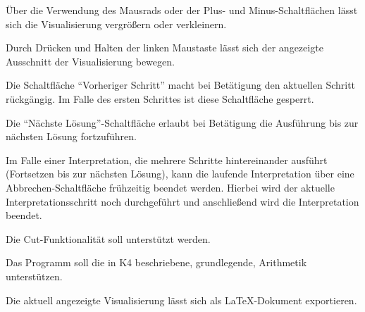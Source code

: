 \documentclass[parskip=full,11pt,twoside]{scrartcl}
\begin{document}

Über die Verwendung des Mausrads oder der Plus- und Minus-Schaltflächen lässt sich die Visualisierung vergrößern oder verkleinern.


Durch Drücken und Halten der linken Maustaste lässt sich der angezeigte Ausschnitt der Visualisierung bewegen.


Die Schaltfläche \enquote{Vorheriger Schritt} macht bei Betätigung den aktuellen Schritt rückgängig. Im Falle des ersten Schrittes ist diese Schaltfläche gesperrt.


Die \enquote{Nächste Lösung}-Schaltfläche erlaubt bei Betätigung die Ausführung bis zur nächsten Lösung fortzuführen.


Im Falle einer Interpretation, die mehrere Schritte hintereinander ausführt (Fortsetzen bis zur nächsten Lösung), kann die laufende Interpretation über eine Abbrechen-Schaltfläche frühzeitig beendet werden. Hierbei wird der aktuelle Interpretationsschritt noch durchgeführt und anschließend wird die Interpretation beendet.


Die Cut-Funktionalität soll unterstützt werden.


Das Programm soll die in K4 beschriebene, grundlegende, Arithmetik unterstützen.


Die aktuell angezeigte Visualisierung lässt sich als LaTeX-Dokument exportieren.

\end{document}
